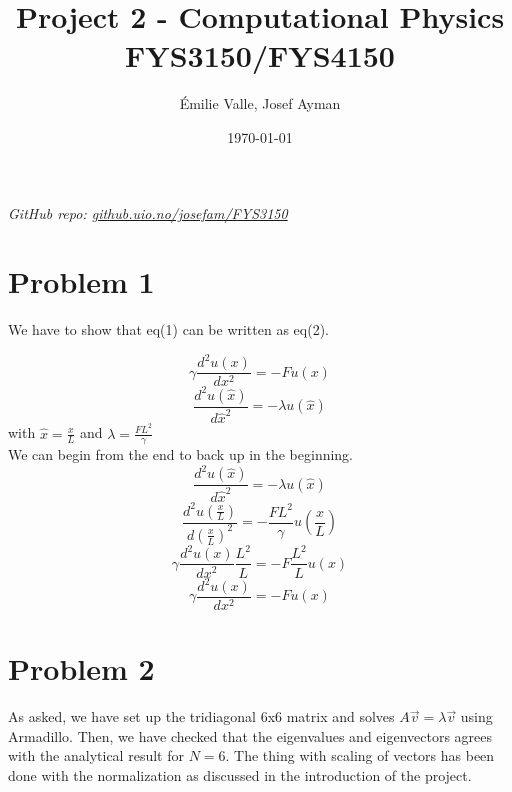 \documentclass[english,notitlepage]{revtex4-1}
\begin{document}
\title{Project 2 - Computational Physics FYS3150/FYS4150 } 
\author{Émilie Valle, Josef Ayman}          
\date{\today}                             
\noaffiliation          %

\maketitle

\textit{GitHub repo: \href{https://github.uio.no/josefam/FYS3150}{github.uio.no/josefam/FYS3150}}

\section{Problem 1}
We have to show that eq(1) can be written as eq(2).

\begin{equation}
    \gamma\frac{d^2u(x)}{dx^2}=-Fu(x)
\end{equation}
\begin{equation}
    \frac{d^2u(\hat{x})}{d\hat{x}^2}=-\lambda u(\hat{x})
\end{equation}
with $\hat{x}=\frac{x}{L}$ and $\lambda=\frac{FL^2}{\gamma}$\\

We can begin from the end to back up in the beginning.
\begin{equation}
    \frac{d^2u(\hat{x})}{d\hat{x}^2}=-\lambda u(\hat{x})
\end{equation}
\begin{equation}
    \frac{d^2u(\frac{x}{L})}{d(\frac{x}{L})^2}=-\frac{FL^2}{\gamma}u(\frac{x}{L})
\end{equation}
\begin{equation}
    \gamma\frac{d^2u(x)}{dx^2}\frac{L^2}{L}=-F\frac{L^2}{L}u(x)
\end{equation}
\begin{equation}
    \gamma\frac{d^2u(x)}{dx^2}=-Fu(x)
\end{equation}

\bigbreak
\section{Problem 2}
As asked, we have set up the tridiagonal 6x6 matrix and solves $A\overrightarrow{v}=\lambda\overrightarrow{v}$ using Armadillo. Then, we have checked that the eigenvalues and eigenvectors agrees with the analytical result for $N=6$. The thing with scaling of vectors has been done with the normalization as discussed in the introduction of the project.
\end{document}
